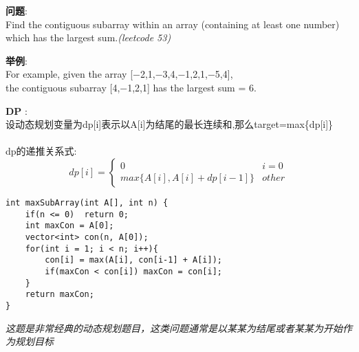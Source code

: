     
\begin{description}
    \item{\textbf{问题}}:\\
Find the contiguous subarray within an array (containing at least one number) which has the largest sum.\textit{(leetcode 53)}\\
    \item{\textbf{举例}}:\\
For example, given the array [−2,1,−3,4,−1,2,1,−5,4],\\
the contiguous subarray [4,−1,2,1] has the largest sum = 6.\\
    \item{\textbf{DP}} : 
    \\设动态规划变量为dp[i]表示以A[i]为结尾的最长连续和,那么target=max\{dp[i]\}\\
	\\dp的递推关系式:
$$
dp[i] =
\begin{cases} 
0 & i = 0  \\
max\{A[i], A[i] + dp[i-1]\} & other 
\end{cases}
$$
    \begin{lstlisting}
int maxSubArray(int A[], int n) {
	if(n <= 0)	return 0;
	int maxCon = A[0];
	vector<int> con(n, A[0]);
	for(int i = 1; i < n; i++){
		con[i] = max(A[i], con[i-1] + A[i]);
		if(maxCon < con[i])	maxCon = con[i];
	}
	return maxCon;
}
    \end{lstlisting}
    \textit{这题是非常经典的动态规划题目，这类问题通常是以某某为结尾或者某某为开始作为规划目标}
\end{description}

